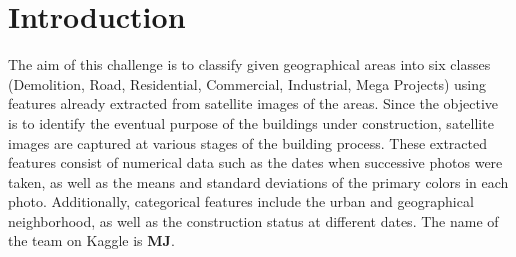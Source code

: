 \section{Introduction}

The aim of this challenge is to classify given geographical areas into six classes (Demolition, Road, Residential, Commercial, Industrial, Mega Projects) using features already extracted from satellite images of the areas. Since the objective is to identify the eventual purpose of the buildings under construction, satellite images are captured at various stages of the building process. These extracted features consist of numerical data such as the dates when successive photos were taken, as well as the means and standard deviations of the primary colors in each photo. Additionally, categorical features include the urban and geographical neighborhood, as well as the construction status at different dates. The name of the team on Kaggle is \textbf{MJ}.
